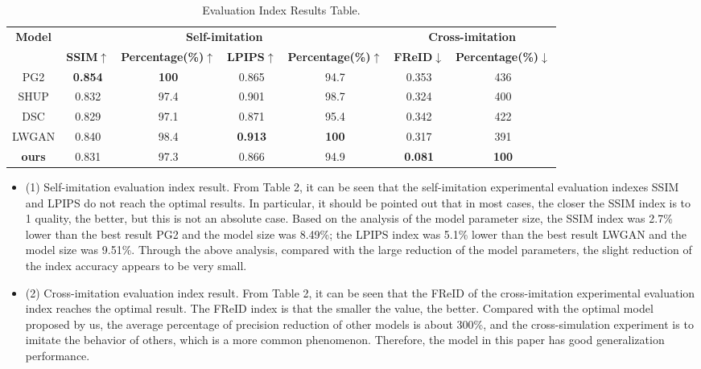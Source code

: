 \begin{table}[]
	\centering
	\caption{Evaluation Index Results Table.}
	{\begin{tabular}[c]{ccccccc}
	 \toprule[1pt]
	 \multirow{2}{*}{{\textbf{Model}}} & \multicolumn{4}{c}{{\textbf{Self-imitation}}} & \multicolumn{ 2}{c}{{\textbf{Cross-imitation}}} \\
	 
	 & \textbf{SSIM}$\uparrow$ & \textbf{Percentage(\%)}$\uparrow$ & \textbf{LPIPS}$\uparrow$ & \textbf{Percentage(\%)}$\uparrow$ & \textbf{FReID}$\downarrow$ & \textbf{Percentage(\%)}$\downarrow$ \\
	 \toprule[1pt]
	 
			PG2   & \textbf{0.854} & \textbf{100} & 0.865 & 94.7 & 0.353 & 436  \\
			SHUP  &          0.832 &         97.4 & 0.901 & 98.7 & 0.324 & 400  \\
			DSC   &          0.829 &         97.1 & 0.871 & 95.4 & 0.342 & 422  \\
			LWGAN &          0.840 &         98.4 & \textbf{0.913} & \textbf{100} & 0.317 & 391 \\
			\hline
	\textbf{ours} &          0.831 &         97.3 & 0.866 & 94.9 & \textbf{0.081} & \textbf{100} \\
			\bottomrule[1pt]
		\end{tabular}
		\label{table_2}}
\end{table}

\begin{itemize}
		
\item[](1) Self-imitation evaluation index result. From Table 2, it can be seen that the self-imitation experimental evaluation indexes SSIM and LPIPS do not reach the optimal results. In particular, it should be pointed out that in most cases, the closer the SSIM index is to 1 quality, the better, but this is not an absolute case. Based on the analysis of the model parameter size, the SSIM index was 2.7\% lower than the best result PG2 and the model size was 8.49\%; the LPIPS index was 5.1\% lower than the best result LWGAN and the model size was 9.51\%. Through the above analysis, compared with the large reduction of the model parameters, the slight reduction of the index accuracy appears to be very small.
		
\item[](2) Cross-imitation evaluation index result. From Table 2, it can be seen that the FReID of the cross-imitation experimental evaluation index reaches the optimal result. The FReID index is that the smaller the value, the better. Compared with the optimal model proposed by us, the average percentage of precision reduction of other models is about 300\%, and the cross-simulation experiment is to imitate the behavior of others, which is a more common phenomenon. Therefore, the model in this paper has good generalization performance.
		
\end{itemize}
